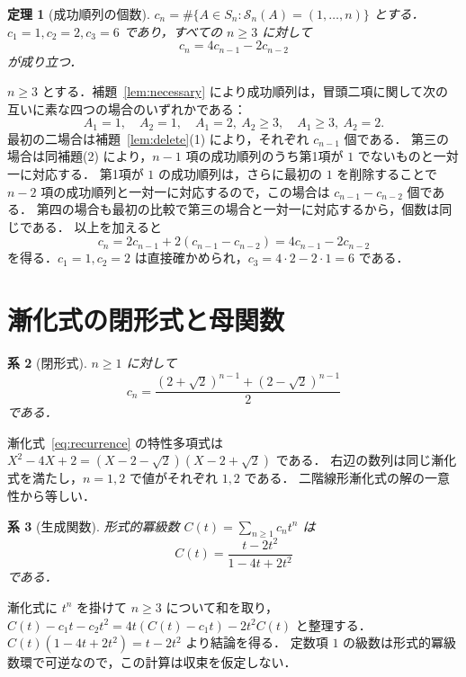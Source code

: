 \documentclass[a5paper,10pt,onecolumn]{jsarticle}
\makeatletter
\theoremstyle{mathnotetheorem}
\newtheorem{theorem}{定理}[section]
\newtheorem{corollary}[theorem]{系}
\renewcommand{\proofname}{証明}
\renewenvironment{proof}[1][\proofname]{%
  \par\pushQED{\qed}\normalfont\topsep4\p@\@plus2\p@\relax
  \trivlist\item[\hskip\labelsep\bfseries #1]\ignorespaces
}{\popQED\endtrivlist\@endpefalse}
\makeatother
\begin{document}
\begin{theorem}[成功順列の個数]\label{thm:recurrence}
$c_n=\#\{A\in S_n:\mathcal S_n(A)=(1,\ldots,n)\}$ とする．
$c_1=1,c_2=2,c_3=6$ であり，すべての $n\ge3$ に対して
\begin{equation}\label{eq:recurrence}
 c_n=4c_{n-1}-2c_{n-2}
\end{equation}
が成り立つ．
\end{theorem}
\begin{proof}
$n\ge3$ とする．補題~\ref{lem:necessary} により成功順列は，冒頭二項に関して次の互いに素な四つの場合のいずれかである：
\[
 A_1=1,\quad A_2=1,\quad
 A_1=2,\ A_2\ge3,\quad
 A_1\ge3,\ A_2=2.
\]
最初の二場合は補題~\ref{lem:delete}(1) により，それぞれ $c_{n-1}$ 個である．
第三の場合は同補題(2) により，$n-1$ 項の成功順列のうち第1項が $1$ でないものと一対一に対応する．
第1項が $1$ の成功順列は，さらに最初の $1$ を削除することで $n-2$ 項の成功順列と一対一に対応するので，この場合は $c_{n-1}-c_{n-2}$ 個である．
第四の場合も最初の比較で第三の場合と一対一に対応するから，個数は同じである．
以上を加えると
\[
 c_n=2c_{n-1}+2(c_{n-1}-c_{n-2})
 =4c_{n-1}-2c_{n-2}
\]
を得る．$c_1=1,c_2=2$ は直接確かめられ，$c_3=4\cdot2-2\cdot1=6$ である．
\end{proof}

\section{漸化式の閉形式と母関数}
\begin{corollary}[閉形式]\label{cor:closed}
$n\ge1$ に対して
\[
 c_n=\frac{(2+\sqrt2)^{n-1}+(2-\sqrt2)^{n-1}}2
\]
である．
\end{corollary}
\begin{proof}
漸化式~\eqref{eq:recurrence} の特性多項式は
$X^2-4X+2=(X-2-\sqrt2)(X-2+\sqrt2)$ である．
右辺の数列は同じ漸化式を満たし，$n=1,2$ で値がそれぞれ $1,2$ である．
二階線形漸化式の解の一意性から等しい．
\end{proof}

\begin{corollary}[生成関数]
形式的冪級数 $C(t)=\sum_{n\ge1}c_nt^n$ は
\[
 C(t)=\frac{t-2t^2}{1-4t+2t^2}
\]
である．
\end{corollary}
\begin{proof}
漸化式に $t^n$ を掛けて $n\ge3$ について和を取り，
$C(t)-c_1t-c_2t^2=4t(C(t)-c_1t)-2t^2C(t)$ と整理する．
$C(t)(1-4t+2t^2)=t-2t^2$ より結論を得る．
定数項 $1$ の級数は形式的冪級数環で可逆なので，この計算は収束を仮定しない．
\end{proof}
\end{document}
